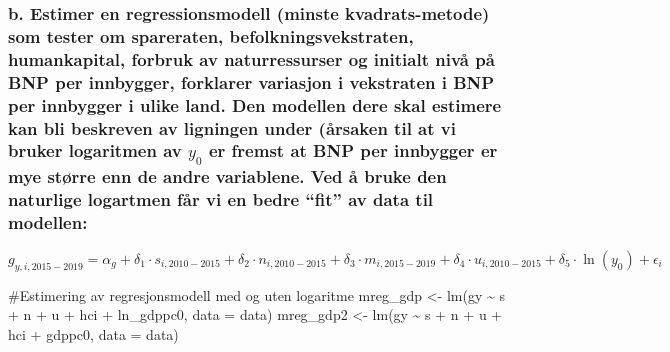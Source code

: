 \documentclass[
  12pt,
  a4paper,
  DIV=11,
  numbers=noendperiod]{scrartcl}
\newenvironment{Shaded}{\begin{snugshade}}{\end{snugshade}}
\newcommand{\AttributeTok}[1]{\textcolor[rgb]{0.40,0.45,0.13}{#1}}
\newcommand{\CommentTok}[1]{\textcolor[rgb]{0.37,0.37,0.37}{#1}}
\newcommand{\FunctionTok}[1]{\textcolor[rgb]{0.28,0.35,0.67}{#1}}
\newcommand{\NormalTok}[1]{\textcolor[rgb]{0.00,0.23,0.31}{#1}}
\newcommand{\OtherTok}[1]{\textcolor[rgb]{0.00,0.23,0.31}{#1}}
\newcommand{\SpecialCharTok}[1]{\textcolor[rgb]{0.37,0.37,0.37}{#1}}
\begin{document}
\subsubsection{\texorpdfstring{b. Estimer en regressionsmodell (minste
kvadrats-metode) som tester om spareraten, befolkningsvekstraten,
humankapital, forbruk av naturressurser og initialt nivå på BNP per
innbygger, forklarer variasjon i vekstraten i BNP per innbygger i ulike
land. Den modellen dere skal estimere kan bli beskreven av ligningen
under (årsaken til at vi bruker logaritmen av \(y_0\) er fremst at BNP
per innbygger er mye større enn de andre variablene. Ved å bruke den
naturlige logartmen får vi en bedre ``fit'' av data til
modellen:}{b. Estimer en regressionsmodell (minste kvadrats-metode) som tester om spareraten, befolkningsvekstraten, humankapital, forbruk av naturressurser og initialt nivå på BNP per innbygger, forklarer variasjon i vekstraten i BNP per innbygger i ulike land. Den modellen dere skal estimere kan bli beskreven av ligningen under (årsaken til at vi bruker logaritmen av y\_0 er fremst at BNP per innbygger er mye større enn de andre variablene. Ved å bruke den naturlige logartmen får vi en bedre ``fit'' av data til modellen:}}\label{b.-estimer-en-regressionsmodell-minste-kvadrats-metode-som-tester-om-spareraten-befolkningsvekstraten-humankapital-forbruk-av-naturressurser-og-initialt-nivuxe5-puxe5-bnp-per-innbygger-forklarer-variasjon-i-vekstraten-i-bnp-per-innbygger-i-ulike-land.-den-modellen-dere-skal-estimere-kan-bli-beskreven-av-ligningen-under-uxe5rsaken-til-at-vi-bruker-logaritmen-av-y_0-er-fremst-at-bnp-per-innbygger-er-mye-stuxf8rre-enn-de-andre-variablene.-ved-uxe5-bruke-den-naturlige-logartmen-fuxe5r-vi-en-bedre-fit-av-data-til-modellen}

\[ g_{y,i,2015-2019} = \alpha_g + \delta_1 \cdot s_{i,2010-2015} + \delta_2 \cdot n_{i,2010-2015} + \delta_3 \cdot m_{i,2015-2019} + \delta_4 \cdot u_{i,2010-2015} + \delta_5 \cdot \ln(y_0) + \epsilon_i \]

\begin{Shaded}
\begin{Highlighting}[]
\CommentTok{\#Estimering av regresjonsmodell med og uten logaritme}
\NormalTok{mreg\_gdp }\OtherTok{\textless{}{-}} \FunctionTok{lm}\NormalTok{(gy }\SpecialCharTok{\textasciitilde{}}\NormalTok{ s }\SpecialCharTok{+}\NormalTok{ n }\SpecialCharTok{+}\NormalTok{ u }\SpecialCharTok{+}\NormalTok{ hci }\SpecialCharTok{+}\NormalTok{ ln\_gdppc0, }\AttributeTok{data =}\NormalTok{ data)}
\NormalTok{mreg\_gdp2 }\OtherTok{\textless{}{-}} \FunctionTok{lm}\NormalTok{(gy }\SpecialCharTok{\textasciitilde{}}\NormalTok{ s }\SpecialCharTok{+}\NormalTok{ n }\SpecialCharTok{+}\NormalTok{ u }\SpecialCharTok{+}\NormalTok{ hci }\SpecialCharTok{+}\NormalTok{ gdppc0, }\AttributeTok{data =}\NormalTok{ data)}
\end{Highlighting}
\end{Shaded}
\end{document}
